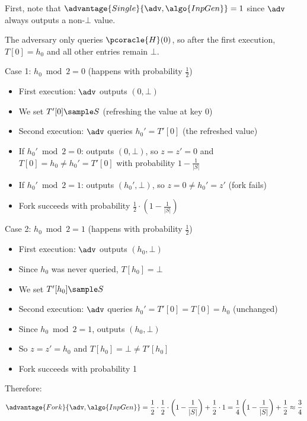\ifsolutions
\begin{mysolution}
  First, note that $\advantage{Single}{\adv, \algo{InpGen}} = 1$ since $\adv$ always outputs a non-$\bot$ value. 
  
  The adversary only queries $\pcoracle{H}(0)$, so after the first execution, $T[0] = h_0$ and all other entries remain $\bot$.
  
  Case 1: $h_0 \bmod 2 = 0$ (happens with probability $\frac{1}{2}$)
  \begin{itemize}
    \item First execution: $\adv$ outputs $(0, \bot)$
    \item We set $T'[0] \sample S$ (refreshing the value at key 0)
    \item Second execution: $\adv$ queries $h_0' = T'[0]$ (the refreshed value)
    \item If $h_0' \bmod 2 = 0$: outputs $(0, \bot)$, so $z = z' = 0$ and $T[0] = h_0 \neq h_0' = T'[0]$ with probability $1 - \frac{1}{|S|}$
    \item If $h_0' \bmod 2 = 1$: outputs $(h_0', \bot)$, so $z = 0 \neq h_0' = z'$ (fork fails)
    \item Fork succeeds with probability $\frac{1}{2} \cdot (1 - \frac{1}{|S|})$
  \end{itemize}
  
  Case 2: $h_0 \bmod 2 = 1$ (happens with probability $\frac{1}{2}$)
  \begin{itemize}
    \item First execution: $\adv$ outputs $(h_0, \bot)$
    \item Since $h_0$ was never queried, $T[h_0] = \bot$
    \item We set $T'[h_0] \sample S$
    \item Second execution: $\adv$ queries $h_0' = T'[0] = T[0] = h_0$ (unchanged)
    \item Since $h_0 \bmod 2 = 1$, outputs $(h_0, \bot)$
    \item So $z = z' = h_0$ and $T[h_0] = \bot \neq T'[h_0]$
    \item Fork succeeds with probability 1
  \end{itemize}
  
  Therefore:
  \[
  \advantage{Fork}{\adv, \algo{InpGen}} = \frac{1}{2} \cdot \frac{1}{2} \cdot \left(1 - \frac{1}{|S|}\right) + \frac{1}{2} \cdot 1 = \frac{1}{4} \left(1 - \frac{1}{|S|}\right) + \frac{1}{2} \approx \frac{3}{4}
  \]
\end{mysolution}
\fi

